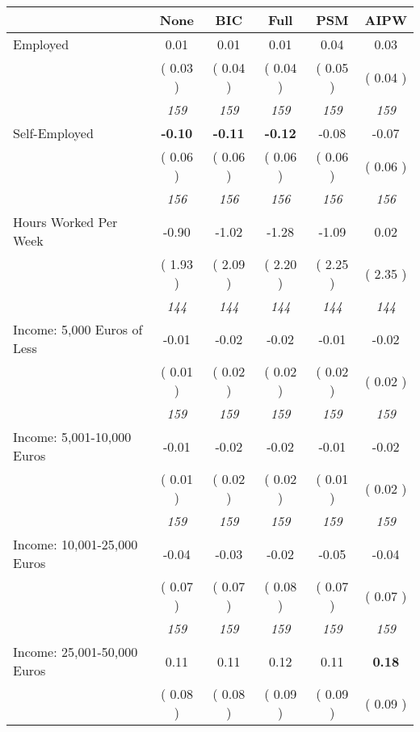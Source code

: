 \begin{tabular}{l c c c c c}
\toprule
 & None & BIC & Full & PSM & AIPW \\
\midrule
Employed &      0.01 &      0.01 &      0.01 &      0.04 &      0.03 \\
& (     0.03 ) & (     0.04 ) & (     0.04 ) & (     0.05 ) & (     0.04 ) \\
& \textit{ 159 } & \textit{ 159 } & \textit{ 159 } & \textit{ 159 } & \textit{ 159 } \\
Self-Employed & \textbf{     -0.10 } & \textbf{     -0.11 } & \textbf{     -0.12 } &     -0.08 &     -0.07 \\
& (     0.06 ) & (     0.06 ) & (     0.06 ) & (     0.06 ) & (     0.06 ) \\
& \textit{ 156 } & \textit{ 156 } & \textit{ 156 } & \textit{ 156 } & \textit{ 156 } \\
Hours Worked Per Week &     -0.90 &     -1.02 &     -1.28 &     -1.09 &      0.02 \\
& (     1.93 ) & (     2.09 ) & (     2.20 ) & (     2.25 ) & (     2.35 ) \\
& \textit{ 144 } & \textit{ 144 } & \textit{ 144 } & \textit{ 144 } & \textit{ 144 } \\
Income: 5,000 Euros of Less &     -0.01 &     -0.02 &     -0.02 &     -0.01 &     -0.02 \\
& (     0.01 ) & (     0.02 ) & (     0.02 ) & (     0.02 ) & (     0.02 ) \\
& \textit{ 159 } & \textit{ 159 } & \textit{ 159 } & \textit{ 159 } & \textit{ 159 } \\
Income: 5,001-10,000 Euros &     -0.01 &     -0.02 &     -0.02 &     -0.01 &     -0.02 \\
& (     0.01 ) & (     0.02 ) & (     0.02 ) & (     0.01 ) & (     0.02 ) \\
& \textit{ 159 } & \textit{ 159 } & \textit{ 159 } & \textit{ 159 } & \textit{ 159 } \\
Income: 10,001-25,000 Euros &     -0.04 &     -0.03 &     -0.02 &     -0.05 &     -0.04 \\
& (     0.07 ) & (     0.07 ) & (     0.08 ) & (     0.07 ) & (     0.07 ) \\
& \textit{ 159 } & \textit{ 159 } & \textit{ 159 } & \textit{ 159 } & \textit{ 159 } \\
Income: 25,001-50,000 Euros &      0.11 &      0.11 &      0.12 &      0.11 & \textbf{     0.18} \\
& (     0.08 ) & (     0.08 ) & (     0.09 ) & (     0.09 ) & (     0.09 ) \\

\end{tabular}
